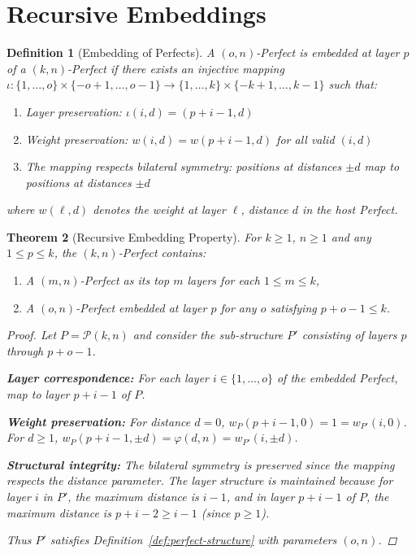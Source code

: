 \documentclass[11pt]{article}
\newcommand{\perfect}{\mathcal{P}}
\newtheorem{definition}{Definition}[section]
\newtheorem{theorem}[definition]{Theorem}
\begin{document}

\section{Recursive Embeddings}\label{sec:embeddings}

\begin{definition}[Embedding of Perfects]\label{def:embedding}
A $(o,n)$-Perfect is \emph{embedded} at layer $p$ of a $(k,n)$-Perfect if there exists an injective mapping $\iota: \{1,\ldots,o\} \times \{-o+1,\ldots,o-1\} \to \{1,\ldots,k\} \times \{-k+1,\ldots,k-1\}$ such that:
\begin{enumerate}
    \item Layer preservation: $\iota(i,d) = (p + i - 1, d)$
    \item Weight preservation: $w(i,d) = w(p+i-1,d)$ for all valid $(i,d)$
    \item The mapping respects bilateral symmetry: positions at distances $\pm d$ map to positions at distances $\pm d$
\end{enumerate}
where $w(\ell,d)$ denotes the weight at layer $\ell$, distance $d$ in the host Perfect.
\end{definition}

\begin{theorem}[Recursive Embedding Property]\label{thm:embedding}
For $k \geq 1$, $n \geq 1$ and any $1 \leq p \leq k$, the $(k,n)$-Perfect contains:
\begin{enumerate}
    \item A $(m,n)$-Perfect as its top $m$ layers for each $1 \leq m \leq k$,
    \item A $(o,n)$-Perfect embedded at layer $p$ for any $o$ satisfying $p + o - 1 \leq k$.
\end{enumerate}
\begin{proof}
Let $P = \perfect(k,n)$ and consider the sub-structure $P'$ consisting of layers $p$ through $p+o-1$.

\textbf{Layer correspondence:} For each layer $i \in \{1,\ldots,o\}$ of the embedded Perfect, map to layer $p+i-1$ of $P$.

\textbf{Weight preservation:} For distance $d=0$, $w_P(p+i-1,0) = 1 = w_{P'}(i,0)$. For $d \geq 1$, 
$w_P(p+i-1,\pm d) = \varphi(d,n) = w_{P'}(i,\pm d)$.

\textbf{Structural integrity:} The bilateral symmetry is preserved since the mapping respects the distance parameter. The layer structure is maintained because for layer $i$ in $P'$, the maximum distance is $i-1$, and in layer $p+i-1$ of $P$, the maximum distance is $p+i-2 \geq i-1$ (since $p \geq 1$).

Thus $P'$ satisfies Definition~\ref{def:perfect-structure} with parameters $(o,n)$.
\end{proof}
\end{theorem}
\end{document}
